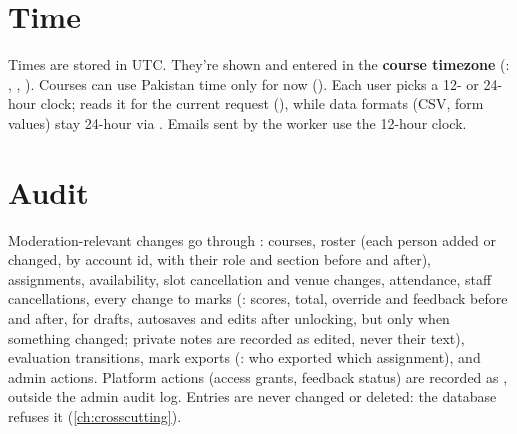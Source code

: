 \section{Time}

Times are stored in UTC. They're shown and entered in the \textbf{course timezone} (: , , ). Courses can use Pakistan time only for now (). Each user picks a 12- or 24-hour clock;  reads it for the current request (), while data formats (CSV, form values) stay 24-hour via . Emails sent by the worker use the 12-hour clock.

\section{Audit}

Moderation-relevant changes go through : courses, roster (each person added or changed, by account id, with their role and section before and after), assignments, availability, slot cancellation and venue changes, attendance, staff cancellations, every change to marks (: scores, total, override and feedback before and after, for drafts, autosaves and edits after unlocking, but only when something changed; private notes are recorded as edited, never their text), evaluation transitions, mark exports (: who exported which assignment), and admin actions. Platform actions (access grants, feedback status) are recorded as , outside the admin audit log. Entries are never changed or deleted: the database refuses it (\cref{ch:crosscutting}).
